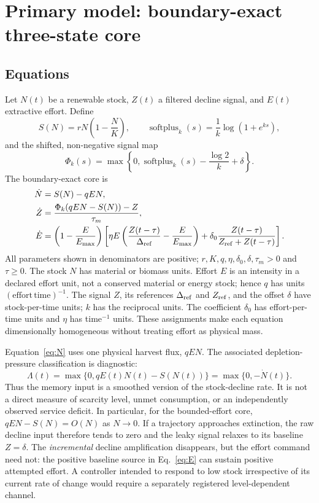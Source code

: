 \documentclass[11pt]{article}
\newcommand{\spx}{\operatorname{softplus}}
\begin{document}
\section{Primary model: boundary-exact three-state core}

\subsection{Equations}

Let $N(t)$ be a renewable stock, $Z(t)$ a filtered decline signal, and $E(t)$ extractive effort. Define
\[
S(N)=rN\left(1-\frac{N}{K}\right),
\qquad
\spx_k(s)=\frac{1}{k}\log(1+e^{ks}),
\]
and the shifted, non-negative signal map
\begin{equation}
\Phi_k(s)=\max\left\{0,\spx_k(s)-\frac{\log2}{k}+\delta\right\}.
\label{eq:phi}
\end{equation}
The boundary-exact core is
\begin{align}
\dot N &= S(N)-qEN, \label{eq:N}\\
\dot Z &= \frac{\Phi_k(qEN-S(N))-Z}{\tau_m}, \label{eq:Z}\\
\dot E &= \left(1-\frac{E}{E_{\max}}\right)
\left[
\eta E\left(\frac{Z(t-\tau)}{\Delta_{\rm ref}}-\frac{E}{E_{\max}}\right)
+\delta_0\frac{Z(t-\tau)}{Z_{\rm ref}+Z(t-\tau)}
\right]. \label{eq:E}
\end{align}
All parameters shown in denominators are positive; $r,K,q,\eta,\delta_0,\delta,\tau_m>0$ and $\tau\ge0$. The stock $N$ has material or biomass units. Effort $E$ is an intensity in a declared effort unit, not a conserved material or energy stock; hence $q$ has units $(\text{effort}\,\text{time})^{-1}$. The signal $Z$, its references $\Delta_{\rm ref}$ and $Z_{\rm ref}$, and the offset $\delta$ have stock-per-time units; $k$ has the reciprocal units. The coefficient $\delta_0$ has effort-per-time units and $\eta$ has time$^{-1}$ units. These assignments make each equation dimensionally homogeneous without treating effort as physical mass.

Equation~\eqref{eq:N} uses one physical harvest flux, $qEN$. The associated depletion-pressure classification is diagnostic:
\begin{equation}
\Lambda(t)=\max\{0,qE(t)N(t)-S(N(t))\}=\max\{0,-\dot N(t)\}.
\label{eq:identity}
\end{equation}
Thus the memory input is a smoothed version of the stock-decline rate. It is not a direct measure of scarcity level, unmet consumption, or an independently observed service deficit. In particular, for the bounded-effort core, $qEN-S(N)=O(N)$ as $N\to0$. If a trajectory approaches extinction, the raw decline input therefore tends to zero and the leaky signal relaxes to its baseline $Z=\delta$. The \emph{incremental} decline amplification disappears, but the effort command need not: the positive baseline source in Eq.~\eqref{eq:E} can sustain positive attempted effort. A controller intended to respond to low stock irrespective of its current rate of change would require a separately registered level-dependent channel.
\end{document}
